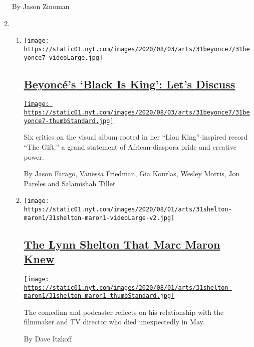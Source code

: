 \begin{enumerate}
  By Jason Zinoman
\item
  \begin{enumerate}
  \def\labelenumii{\arabic{enumii}.}
  \item
    \texttt{[image: https://static01.nyt.com/images/2020/08/03/arts/31beyonce7/31beyonce7-videoLarge.jpg]}

    \hypertarget{beyoncuxe9s-black-is-king-lets-discuss}{%
    \subsection{\texorpdfstring{\href{/2020/07/31/arts/music/beyonce-black-is-king.html}{Beyoncé's
    `Black Is King': Let's
    Discuss}}{Beyoncé's `Black Is King': Let's Discuss}}\label{beyoncuxe9s-black-is-king-lets-discuss}}

    \href{/2020/07/31/arts/music/beyonce-black-is-king.html}{\texttt{[image: https://static01.nyt.com/images/2020/08/03/arts/31beyonce7/31beyonce7-thumbStandard.jpg]}}

    Six critics on the visual album rooted in her ``Lion King''-inspired
    record ``The Gift,'' a grand statement of African-diaspora pride and
    creative power.

    By Jason Farago, Vanessa Friedman, Gia Kourlas, Wesley Morris, Jon
    Pareles and Salamishah Tillet
  \item
    \texttt{[image: https://static01.nyt.com/images/2020/08/01/arts/31shelton-maron1/31shelton-maron1-videoLarge-v2.jpg]}

    \hypertarget{the-lynn-shelton-that-marc-maron-knew}{%
    \subsection{\texorpdfstring{\href{/2020/07/31/movies/marc-maron-lynn-shelton.html}{The
    Lynn Shelton That Marc Maron
    Knew}}{The Lynn Shelton That Marc Maron Knew}}\label{the-lynn-shelton-that-marc-maron-knew}}

    \href{/2020/07/31/movies/marc-maron-lynn-shelton.html}{\texttt{[image: https://static01.nyt.com/images/2020/08/01/arts/31shelton-maron1/31shelton-maron1-thumbStandard.jpg]}}

    The comedian and podcaster reflects on his relationship with the
    filmmaker and TV director who died unexpectedly in May.

    By Dave Itzkoff
  \end{enumerate}
\end{enumerate}

